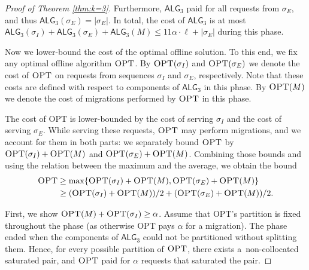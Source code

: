 \documentclass[a4paper,anonymous,USenglish]{lipics-v2019}
\newcommand{\OPT}{\textsc{OPT}\xspace}
\newcommand{\TAlg}{{\ensuremath{\textsf{ALG}_{3}}}\xspace}
\newcommand\maciek[1]{\color{brown}\textbf{(Maciek: #1)}\color{black}}
\begin{document}
\begin{proof}[Proof of Theorem \ref{thm:k=3}]
	
	Furthermore, \TAlg paid for all requests from $\sigma_E$, and thus $\TAlg(\sigma_E) = |\sigma_E|$.
	In total, the cost of \TAlg is at most $\TAlg(\sigma_I) + \TAlg(\sigma_E) + \TAlg(M) \leq 11\alpha\cdot \ell + |\sigma_E|$ during this phase.
	
	\medskip
	
	Now we lower-bound the cost of the optimal offline solution.
	To this end, we fix any optimal offline algorithm $\OPT$.
	By $\OPT(\sigma_I)$ and $\OPT(\sigma_E)$ we denote the cost of $\OPT$ on requests from sequences $\sigma_I$ and $\sigma_E$, respectively.
	Note that these costs are defined with respect to components of \TAlg in this phase.
	By $\OPT(M)$ we denote the cost of migrations performed by $\OPT$ in this phase.
	
	The cost of \OPT is lower-bounded by the cost of serving $\sigma_I$ and the cost of serving $\sigma_E$.
	While serving these requests, $\OPT$ may perform migrations, and we account for them in both parts: we separately bound $\OPT$ by $\OPT(\sigma_I) + \OPT(M)$ and $\OPT(\sigma_E) + \OPT(M)$.
	Combining those bounds and using the relation between the maximum and the average, we obtain the bound
	\begin{align*}
		\OPT&\geq \max\{\OPT(\sigma_I) + \OPT(M), \OPT(\sigma_E) + \OPT(M)\}\\
		&\geq (\OPT(\sigma_I) + \OPT(M)) / 2 + (\OPT(\sigma_E) + \OPT(M)) / 2.
	\end{align*}
	
	
	First, we show $\OPT(M) + \OPT(\sigma_I) \geq \alpha$.
	Assume that \OPT's partition is fixed throughout the phase (as otherwise \OPT pays $\alpha$ for a migration).
	The phase ended when the components of \TAlg{} could not be partitioned without splitting them.
	Hence, for every possible partition of $\OPT$, there exists a~non-collocated saturated pair, and
	$\OPT$ paid for $\alpha$ requests that saturated the pair.


\end{proof}
\end{document}
